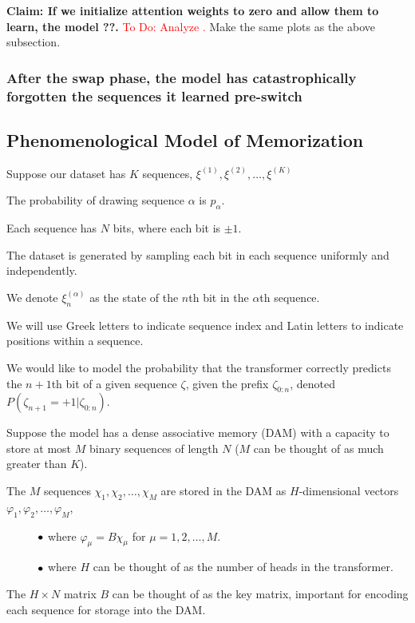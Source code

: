 \documentclass{article}
\theoremstyle{plain}
\theoremstyle{definition}
\theoremstyle{remark}
\begin{document}
\textbf{Claim: If we initialize attention weights to zero and allow them to learn, the model ??.} 
\textcolor{red}{To Do: Analyze .}
Make the same plots as the above subsection.     

\subsubsection{After the swap phase, the model has catastrophically forgotten the sequences it learned pre-switch}


\subsection{Phenomenological Model of Memorization}
 
Suppose our dataset has $K$ sequences, $\xi^{(1)}, \xi^{(2)}, \ldots, \xi^{(K)}$ 

The probability of drawing sequence $\alpha$ is $p_{\alpha}$. 

Each sequence has $N$ bits, where each bit is $\pm 1$.

The dataset is generated by sampling each bit in each sequence uniformly and independently. 

We denote $\xi_{n}^{(\alpha)}$ as the state of the $n$th bit in the $\alpha$th sequence. 


We will use Greek letters to indicate sequence index and Latin letters to indicate positions within a sequence. 

\clearpage 
We would like to model the probability that the transformer correctly predicts the $n+1$th bit of a given sequence $\zeta$, given the prefix $\zeta_{0:n}$, denoted $P(\zeta_{n+1}= +1 | \zeta_{0:n})$. 

Suppose the model has a dense associative memory (DAM) with a capacity to store at most $M$ binary sequences of length $N$ ($M$ can be thought of as much greater than $K$).

The $M$ sequences $\chi_1,\chi_2,\dots,\chi_M$ are stored in the DAM as $H$-dimensional vectors  $\varphi_1,\varphi_2,\dots,\varphi_M$,

$\mkern 50mu \bullet $ where $\varphi_{\mu} = B \chi_{\mu}$  for $\mu = 1,2,\dots, M$. 

$\mkern 50mu \bullet $ where $H$ can be thought of as the number of heads in the transformer. 


The $H\times N$ matrix $B$ can be thought of as the key matrix, important for encoding each sequence for storage into the DAM.
\end{document}
